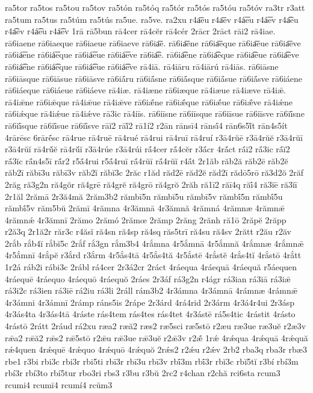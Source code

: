 {ra5tor
ra5tos
ra5tou
ra5tov
ra5tón
ra5tóq
ra5tór
ra5tós
ra5tóu
ra5tóv
ra3tr
r3att
ra5tum
ra5tus
ra5túm
ra5tús
ra5ue.
ra5ve.
ra2xu
r4a͞eu
r4a͞ev
r4á͞eu
r4á͞ev
r4a͡eu
r4a͡ev
r4á͡eu
r4á͡ev
1rā
rā5bun
rā4cer
rā4cĕr
rā4cér
2rācr
2rāct
rāi2
rā4iae.
rā6iaene
rā6iaeque
rā6iaeue
rā6iaeve
rā6ia͞e.
rā6ia͞ene
rā6ia͞eque
rā6ia͞eue
rā6ia͞eve
rā6iá͞ene
rā6iá͞eque
rā6iá͞eue
rā6iá͞eve
rā6ia͡e.
rā6ia͡ene
rā6ia͡eque
rā6ia͡eue
rā6ia͡eve
rā6iá͡ene
rā6iá͡eque
rā6iá͡eue
rā6iá͡eve
rā4iā.
rā4iāru
rā4iārú
rā4iās.
rā6iāsne
rā6iāsque
rā6iāsue
rā6iāsve
rā6iā́ru
rā6iā́sne
rā6iā́sque
rā6iā́sue
rā6iā́sve
rā6iáene
rā6iáeque
rā6iáeue
rā6iáeve
rā4iæ.
rā4iæne
rā6iæque
rā4iæue
rā4iæve
rā4iǣ.
rā4iǣne
rā6iǣque
rā4iǣue
rā4iǣve
rā6iǣ́ne
rā6iǣ́que
rā6iǣ́ue
rā6iǣ́ve
rā4iǽne
rā6iǽque
rā4iǽue
rā4iǽve
rā3ic
rā4iīs.
rā6iīsne
rā6iīsque
rā6iīsue
rā6iīsve
rā6iī́sne
rā6iī́sque
rā6iī́sue
rā6iī́sve
rāĭ2
rāĭ́2
rā1í2
r2ān
rānsī4
rānsī́4
rān6s5ĭ́t
rān4s5ít
4rārēsc
6rārḗsc
rā4rue
rā4ruē
rā4rué
rā4rui
rā4ruī
rā4ruí
r3ā4rŭē
r3ā4rŭĕ
r3ā4rŭī
r3ā4rŭĭ
rā4rŭ́ĕ
rā4rŭ́ĭ
r3ā4rúe
r3ā4rúi
rā́4cer
rā́4cĕr
r3ā́cr
4rā́ct
rā́i2
rā́3ic
rā́ĭ2
rā́3ĭc
rā́n4s5ī
rā́r2
r5ā́4rui
r5ā́4ruī
rā́4rŭī
rā́4rŭĭ
r4ā́t
2r1ăb
răb2ă
răb2ē
răb2ĕ
răb2ī
răbī3u
răbī3v
răb2ĭ
răbĭ3c
2răc
r1ăd
răd2ē
răd2ĕ
răd2ī
rădō5rō
ră3d2ŏ
2răf
2răg
ră3g2n
ră4gŏr
ră4grē
ră4grĕ
ră4grō
ră4grŏ
2răh
ră1ī2
răī4q
răī́4
ră3ĭē
ră3ĭī
2r1ăl
2rămā
2r3ă4mă
2răm3b2
rămbī5n
rămbī5u
rămbī5v
rămbī́5n
rămbī́5u
rămbī́5v
răm5bŭ
2rămī
4rămna
4r3ămnā
4r3ămnă
4rămná
4rămnæ
4rămnǣ
4rămnǽ
4r3ămnī
2rămo
2rămó
2rămœ
2rămp
2răng
2rănh
ră1ō
2răpĕ
2răpp
r2ă3q
2r1ă2r
răr3c
r4ăsĭ
ră4sn
ră4sp
ră4sq
răs5trī
ră4su
ră4sv
2rătt
r2ău
r2ăv
2rắb
rắb4ĭ
rắbĭ5c
2rắf
rắ3gn
rắm3b4
4rắmna
4r5ắmnā
4r5ắmnă
4rắmnæ
4rắmnǣ
4r5ắmnī
4rắpĕ
r3ắrd
r3ắrm
4r5ắs4tā
4r5ắs4tă
4r5ắstē
4rắstĕ
4rắs4tĭ
4rắstō
4rắtt
1r2á
ráb2i
rábi3c
2rábl
rá4cer
2r3á2cr
2ráct
4ráequa
4ráequā
4ráequă
r5áequen
4ráequē
4ráequo
4ráequō
4ráequŏ
2ráes
2r3áf
rá3g2n
r4ágr
rá3ian
rá3iā
rá3iǣ
rá3i2c
rá3ien
rá3iē
rá2iu
rá3li
2ráll
rám3b2
4r3ámna
4r3ámnā
4rámnæ
4rámnǣ
4r3ámni
4r3ámnī
2rámp
ráns5is
2rápe
2r3árd
4rá4rid
2r3árm
4r3á4r4ui
2r3ásp
4r3ás4ta
4r3ás4tā
4ráste
rás4tem
rás4tes
rás4tet
4r3ástē
rá5s4tic
4rástit
4rásto
4rástō
2rátt
2ráud
rá2xu
ræa2
ræă2
ræs2
ræ5sci
ræ5stō
r2æu
ræ3ue
ræ3uĕ
r2æ3v
rǣa2
rǣă2
rǣs2
rǣ5stō
r2ǣu
rǣ3ue
rǣ3uĕ
r2ǣ3v
r2ǣ́
1rǽ
4rǽqua
4rǽquā
4rǽquă
rǽ4quen
4rǽquē
4rǽquo
4rǽquō
4rǽquŏ
2rǽs2
r2ǽu
r2ǽv
2rb2
rba3q
rba3r
rbæ3
rbe1
r3bi
rbi3c
rbi3r
rbi5ti
rbī3r
rbī3u
rbī3v
rbī́3m
rbī́3r
rbĭ3c
rbĭ5tĭ
r3bí
rbí3m
rbí3r
rbí3to
rbí5tur
rbo3ri
rbs3
r3bu
r3bŭ
2rc2
r4chan
r2chă
rci6sta
rcum3
rcumi4
rcumī4
rcumí4
rcŭm3
}
